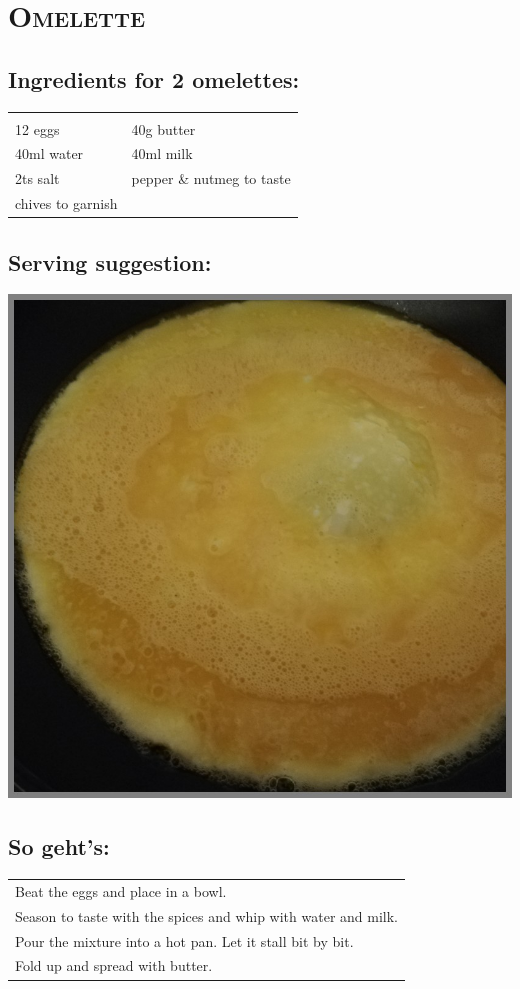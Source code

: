 \section{\textsc{Omelette}}

\subsection*{Ingredients for 2 omelettes:}

\begin{tabular}{p{7.5cm} p{7.5cm}}
	& \\
	12 eggs & 40g butter \\
	40ml water & 40ml milk \\
  2ts salt & pepper \& nutmeg to taste \\
  chives to garnish &
\end{tabular}

\subsection*{Serving suggestion:}

\includegraphics[width=\textwidth]{img/omlett.jpg} \cite{omlett}

\subsection*{So geht's:}

\begin{tabular}{p{15cm}}
	\\
  Beat the eggs and place in a bowl.\\
  Season to taste with the spices and whip with water and milk.\\
  Pour the mixture into a hot pan. Let it stall bit by bit.\\
  Fold up and spread with butter.
\end{tabular}

